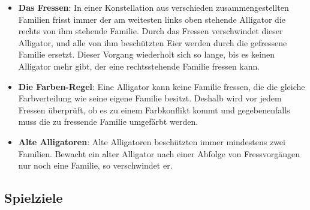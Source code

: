 	\begin{itemize}

		\item \textbf{Das Fressen}: In einer Konstellation aus verschieden zusammengestellten Familien frisst immer der am weitesten links oben stehende Alligator die rechts von ihm stehende Familie.
		Durch das Fressen verschwindet dieser Alligator, und alle von ihm beschützten Eier werden durch die gefressene Familie ersetzt.
		Dieser Vorgang wiederholt sich so lange, bis es keinen Alligator mehr gibt, der eine rechtsstehende Familie fressen kann.

		\item \textbf{Die Farben-Regel}: Eine Alligator kann keine Familie fressen, die die gleiche Farbverteilung wie seine eigene Familie besitzt.
		Deshalb wird vor jedem Fressen überprüft, ob es zu einem Farbkonflikt kommt und gegebenenfalls muss die zu fressende Familie umgefärbt werden.

		\item \textbf{Alte Alligatoren}: Alte Alligatoren beschützten immer mindestens zwei Familien.
		Bewacht ein alter Alligator nach einer Abfolge von Fressvorgängen nur noch eine Familie, so verschwindet er.

	\end{itemize}

\subsection{Spielziele}


